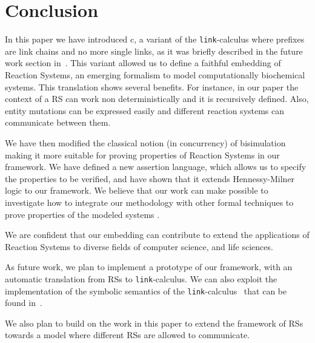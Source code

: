 
\section{Conclusion}\label{sec:conclusion}

In this paper we have introduced c\CNA, a variant of the {\tt link}-calculus
where prefixes are link chains and no more single links, as it was 
briefly described in the future work section in~\cite{BBB17}.
This variant allowed us to define 
a faithful embedding of Reaction Systems,
an emerging formalism to model computationally biochemical systems.
This translation shows several benefits.
For instance, in our paper the context of a RS can work non deterministically and it 
is recursively defined.
Also, entity mutations can be expressed easily and different reaction systems can
communicate between them.

We have then modified the classical notion (in concurrency) of bisimulation
making it more suitable for proving properties of Reaction Systems in our
framework.
We have defined a new assertion language, which allows us to specify
the properties to be verified, and have shown that it extends Hennessy-Milner logic
to our framework.
We believe that our work can make 
possible to investigate how to integrate our methodology
with other formal techniques to prove 
properties of the modeled systems \cite{CFHOT15,OCHF16,BBGLBH2017}.

We are confident that our embedding can contribute to extend the applications
of Reaction Systems to diverse fields of computer science, and life
sciences.

As future work, we plan to implement a prototype of our framework,
with an automatic translation from RSs to  {\tt link}-calculus. 
We can also exploit the implementation of  the symbolic semantics of 
the {\tt link}-calculus~\cite{BrodoO17} that can be found in~\cite{tool}.

We also plan to build on the work in this paper to extend the framework
of RSs towards a model where different RSs are allowed to communicate.
